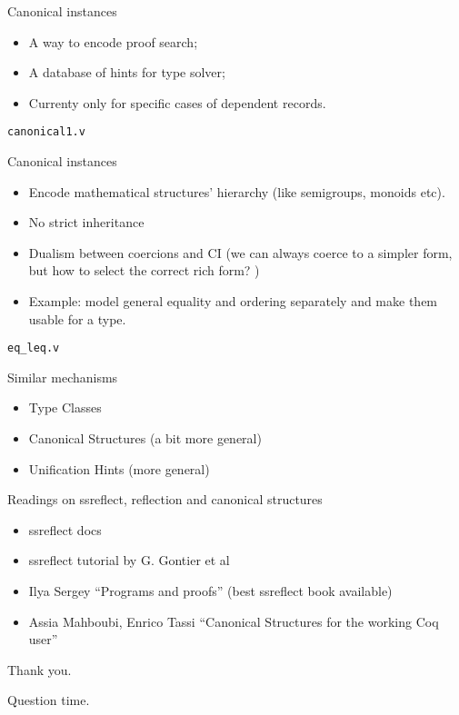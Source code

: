 \documentclass{beamer}
\begin{document}
\begin{frame}{Canonical instances}
    \begin{itemize}
        \item A way to encode proof search;
        \item A database of hints for type solver;
        \item Currenty only for specific cases of dependent records.
    \end{itemize}
    \texttt{canonical1.v}
\end{frame}




\begin{frame}{Canonical instances}
    \begin{itemize}
        \item Encode mathematical structures' hierarchy (like semigroups,
        monoids etc).
        \item No strict inheritance
        \item Dualism between coercions and CI (we can always coerce to a 
            simpler form, but how to select the correct rich form? )

        \item Example: model general equality and ordering separately and make
    them usable for a type.  \end{itemize}
    \texttt{eq\_leq.v}

\end{frame}

\begin{frame}{Similar mechanisms}
    \begin{itemize}
        \item Type Classes 
        \item Canonical Structures (a bit more general)
        \item Unification Hints (more general)
    \end{itemize}

\end{frame}



\begin{frame}{Readings on ssreflect, reflection and canonical structures}
    \begin{itemize}
        \item ssreflect docs 
        \item ssreflect tutorial by G. Gontier et al
        \item Ilya Sergey ``Programs and proofs'' (best ssreflect book
        available) 
        \item Assia Mahboubi, Enrico Tassi ``Canonical Structures
            for the working Coq user'' 
    \end{itemize}
\end{frame}

\begin{frame}
    Thank you.

    Question time.
\end{frame}
\end{document}
